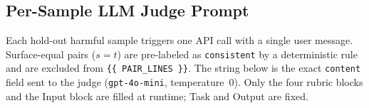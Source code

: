 
\subsection{Per-Sample LLM Judge Prompt}
\label{app:rubric-prompt}

Each hold-out harmful sample triggers one API call with a single user message.
Surface-equal pairs ($s\!=\!t$) are pre-labeled as \texttt{consistent} by a deterministic
rule and are excluded from \texttt{\{\{ PAIR\_LINES \}\}}.
The string below is the exact \texttt{content} field sent to the judge
(\texttt{gpt-4o-mini}, temperature~$0$).
Only the four rubric blocks and the Input block are filled at runtime; Task and Output
are fixed.

